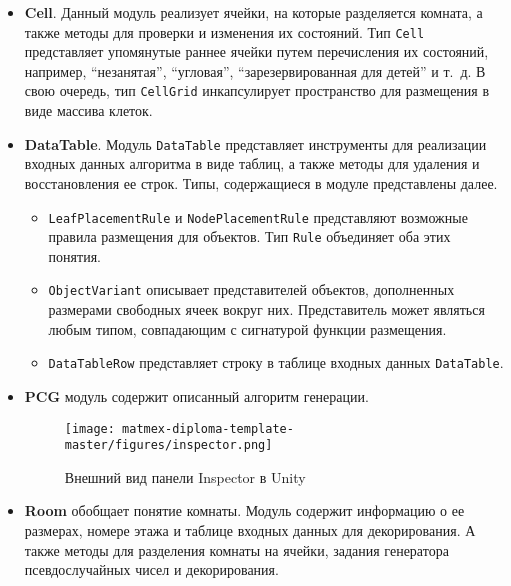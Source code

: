 \begin{itemize}

    \item \textbf{Cell}. Данный модуль реализует ячейки, на которые разделяется комната, а также методы для проверки и изменения их состояний. Тип \texttt{Cell} представляет упомянутые раннее ячейки путем перечисления их состояний, например, \enquote{незанятая}, \enquote{угловая}, \enquote{зарезервированная для детей} и т.~д. В свою очередь, тип \texttt{CellGrid} инкапсулирует пространство для размещения в виде массива клеток. 
    
    \item \textbf{DataTable}. Модуль \texttt{DataTable} представляет инструменты для реализации входных данных алгоритма в виде таблиц, а также методы для удаления и восстановления ее строк. Типы, содержащиеся в модуле представлены далее.
        \begin{itemize}
            \item \texttt{LeafPlacementRule} и \texttt{NodePlacementRule} представляют возможные правила размещения для объектов. Тип \texttt{Rule} объединяет оба этих понятия.
    
            \item \texttt{ObjectVariant} описывает представителей объектов, дополненных размерами свободных ячеек вокруг них. Представитель может являться любым типом, совпадающим с сигнатурой функции размещения.
            
            \item \texttt{DataTableRow} представляет строку в таблице входных данных \texttt{DataTable}.
        \end{itemize}
    
    \item \textbf{PCG} модуль содержит описанный алгоритм генерации.

    \begin{figure}
        \centering
        \texttt{[image: matmex-diploma-template-master/figures/inspector.png]}
        \caption{Внешний вид панели Inspector в Unity}
        \label{fig:inspector}
    \end{figure}

    \item \textbf{Room} обобщает понятие комнаты. Модуль содержит информацию о ее размерах, номере этажа и таблице входных данных для декорирования. А также методы для разделения комнаты на ячейки, задания генератора псевдослучайных чисел и декорирования.
    

\end{itemize}
